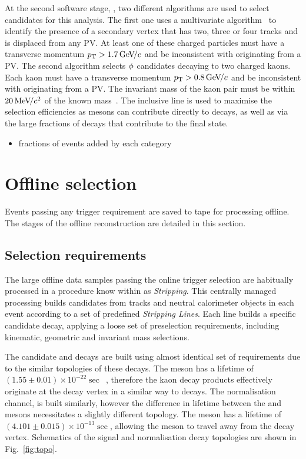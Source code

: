 At the second software stage, \hlttwo, two different algorithms are used to select candidates for this analysis.
The first one uses a multivariate algorithm~\cite{BBDT} to identify the presence of a secondary vertex that has two, three or four tracks and is displaced from any PV. At least one of these charged particles must have a transverse momentum $\mbox{$p_{\mathrm{ T}}$} > 1.7{\mathrm{\,Ge\kern -0.1em V\!/}c}$ and be inconsistent with originating from a PV. 
The second algorithm selects $\phi$ candidates decaying to two charged kaons. Each kaon must have a transverse momentum $\mbox{$p_{\mathrm{ T}}$} > 0.8{\mathrm{\,Ge\kern -0.1em V\!/}c}$ and be inconsistent with originating from a PV. The invariant mass of the kaon pair must be within $20{\mathrm{\,Me\kern -0.1em V\!/}c^2}$ of the known \phiz mass~\cite{PDG2016}.
The inclusive \phiz line is used to maximise the selection efficiencies as \phiz mesons can contribute directly to \decay{\Bp}{\Dsp\phiz} decays, as well as via the large fractions of \decay{\Dsp}{\phiz\pip} decays that contribute to the \decay{\Dsp}{\Kp\Km\pip} final state.

{\color{Red}
\begin{itemize}
\item fractions of events added by each category
\end{itemize}
}

\section{Offline selection}

Events passing any trigger requirement are saved to tape for processing offline. The stages of the offline reconstruction are detailed in this section.

\subsection{Selection requirements}

The large offline data samples passing the online trigger selection are habitually processed in a procedure know within \lhcb as \emph{Stripping}. This centrally managed processing builds candidates from tracks and neutral calorimeter objects in each event according to a set of predefined \emph{Stripping Lines}. Each line builds a specific candidate decay, applying a loose set of preselection requirements, including kinematic, geometric and invariant mass selections. 

The candidate \decay{\Bp}{\Dsp\phiz} and \decay{\Bp}{\Dsp\Kp\Km} decays are built using almost identical set of requirements due to the similar topologies of these decays. The \phiz meson has a lifetime of $(1.55\pm0.01)\times10^{-22}\sec$~\cite{PDG2016}, therefore the kaon decay products effectively originate at the \Bp decay vertex in a similar way to \decay{\Bp}{\Dsp\Kp\Km} decays.  The normalisation channel, \decay{\Bp}{\Dsp\Dzb} is built similarly, however the difference in lifetime between the \Dzb and \phiz mesons necessitates a slightly different topology. The \Dzb meson has a lifetime of $(4.101\pm0.015)\times10^{-13}\sec$, allowing the meson to travel away from the \Bp decay vertex. Schematics of the signal and normalisation decay topologies are shown in Fig.~\ref{fig:topo}.

